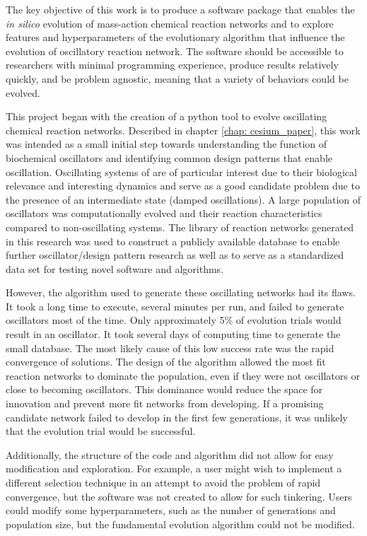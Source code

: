 \documentclass[12pt]{report}
\begin{document}
The key objective of this work is to produce a software package that enables the \textit{in silico} evolution of mass-action chemical reaction networks and to explore features and hyperparameters of the evolutionary algorithm that influence the evolution of oscillatory reaction network. The software should be accessible to researchers with minimal programming experience, produce results relatively quickly, and be problem agnostic, meaning that a variety of behaviors could be evolved.  

This project began with the creation of a python tool to evolve oscillating chemical reaction networks. Described in chapter \ref{chap: cesium_paper}, this work was intended as a small initial step towards understanding the function of biochemical oscillators and identifying common design patterns that enable oscillation. Oscillating systems of are of particular interest due to their biological relevance and interesting dynamics and serve as a good candidate problem due to the presence of an intermediate state (damped oscillations). A large population of oscillators was computationally evolved and their reaction characteristics compared to non-oscillating systems. The library of reaction networks generated in this research was used to construct a publicly available database to enable further oscillator/design pattern research as well as to serve as a standardized data set for testing novel software and algorithms. 

However, the algorithm used to generate these oscillating networks had its flaws. It took a long time to execute, several minutes per run, and failed to generate oscillators most of the time. Only approximately 5\% of evolution trials would result in an oscillator. It took several days of computing time to generate the small database. The most likely cause of this low success rate was the rapid convergence of solutions. The design of the algorithm allowed the most fit reaction networks to dominate the population, even if they were not oscillators or close to becoming oscillators. This dominance would reduce the space for innovation and prevent more fit networks from developing. If a promising candidate network failed to develop in the first few generations, it was unlikely that the evolution trial would be successful.

Additionally, the structure of the code and algorithm did not allow for easy modification and exploration. For example, a user might wish to implement a different selection technique in an attempt to avoid the problem of rapid convergence, but the software was not created to allow for such tinkering. Users could modify some hyperparameters, such as the number of generations and population size, but the fundamental evolution algorithm could not be modified. 
\end{document}
